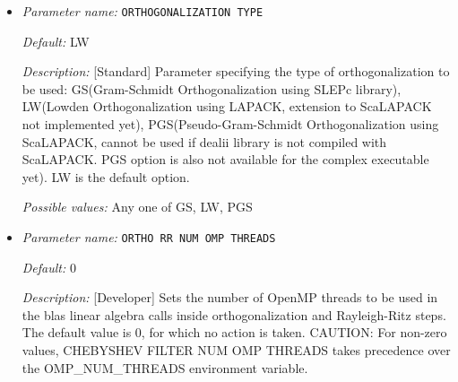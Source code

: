 \begin{itemize}


{\it Default:} 10


{\it Description:} [Standard] Number of Kohn-Sham wavefunctions to be computed. For insulators use N/2+(10-20) and for metals use 20 percent more than N/2 (atleast 10 more). N is the total number of electrons.


{\it Possible values:} An integer $n$ such that $0\leq n \leq 2147483647$
\item {\it Parameter name:} {\tt ORTHOGONALIZATION TYPE}
\label{parameters:SCF parameters/Eigen_2dsolver_2fChebyshev solver related parameters/ORTHOGONALIZATION TYPE}
\label{parameters:SCF_20parameters/Eigen_2dsolver_2fChebyshev_20solver_20related_20parameters/ORTHOGONALIZATION_20TYPE}




{\it Default:} LW


{\it Description:} [Standard] Parameter specifying the type of orthogonalization to be used: GS(Gram-Schmidt Orthogonalization using SLEPc library), LW(Lowden Orthogonalization using LAPACK, extension to ScaLAPACK not implemented yet), PGS(Pseudo-Gram-Schmidt Orthogonalization using ScaLAPACK, cannot be used if dealii library is not compiled with ScaLAPACK. PGS option is also not available for the complex executable yet). LW is the default option.


{\it Possible values:} Any one of GS, LW, PGS
\item {\it Parameter name:} {\tt ORTHO RR NUM OMP THREADS}
\label{parameters:SCF parameters/Eigen_2dsolver_2fChebyshev solver related parameters/ORTHO RR NUM OMP THREADS}
\label{parameters:SCF_20parameters/Eigen_2dsolver_2fChebyshev_20solver_20related_20parameters/ORTHO_20RR_20NUM_20OMP_20THREADS}




{\it Default:} 0


{\it Description:} [Developer] Sets the number of OpenMP threads to be used in the blas linear algebra calls inside orthogonalization and Rayleigh-Ritz steps. The default value is 0, for which no action is taken. CAUTION: For non-zero values, CHEBYSHEV FILTER NUM OMP THREADS takes precedence over the OMP\_NUM\_THREADS environment variable.



\end{itemize}
